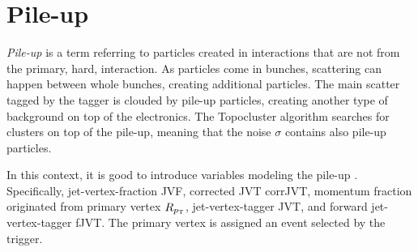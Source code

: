 \section{Pile-up}
\label{sec:pileup}
\emph{Pile-up} is a term referring to particles created in interactions that are not from the primary, hard, interaction.
As particles come in bunches, scattering can happen between whole bunches, creating additional particles.
The main scatter tagged by the tagger is clouded by pile-up particles, creating another type of background on top of the electronics.
The Topocluster algorithm searches for clusters on top of the pile-up, meaning that the noise $\sigma$ contains also pile-up particles.

In this context, it is good to introduce variables modeling the pile-up \cite{jvt}.
Specifically, jet-vertex-fraction JVF, corrected JVT corrJVT, momentum fraction originated from primary vertex $R_{p_\text{T}}$, jet-vertex-tagger JVT, and forward jet-vertex-tagger fJVT.
The primary vertex is assigned an event selected by the trigger.  
